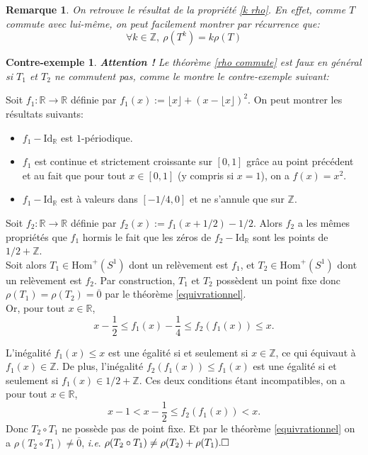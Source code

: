 \documentclass[11pt,a4 paper]{article}
\newtheorem{contrex}[theoreme]{Contre-exemple}
\newtheorem{rmq}[theoreme]{Remarque}
\begin{document}
\begin{rmq}
	On retrouve le résultat de la propriété \ref{k rho}. En effet, comme $T$ commute avec lui-même, on peut facilement montrer par récurrence que:
	$$\forall k \in \mathbb{Z}, \ \rho(T^k)=k\rho(T)$$
\end{rmq}










\begin{contrex} \textbf{Attention !} Le théorème \ref{rho commute} est faux en général si $T_1$ et $T_2$ ne commutent pas, comme le montre le contre-exemple suivant: \end{contrex}
	Soit $f_1: \mathbb{R} \to \mathbb{R}$ définie par $f_1(x):=\lfloor x \rfloor + (x - \lfloor x \rfloor)^2$. On peut montrer les résultats suivants:
	\begin{itemize}[label =$\bullet$]
		\item $f_1 - \mathrm{Id_{\mathbb{R}}}$ est $1$-périodique.
		\item $f_1$ est continue et strictement croissante sur $[0,1]$ grâce au point précédent et au fait que pour tout $x \in [0,1]$ (y compris si $x=1$), on a $f(x)=x^2$.
		\item $f_1 - \mathrm{Id_{\mathbb{R}}}$ est à valeurs dans $[-1/4,0]$ et ne s'annule que sur $\mathbb{Z}$.
	\end{itemize}
	Soit $f_2: \mathbb{R} \to \mathbb{R}$ définie par $f_2(x):=f_1(x +1/2)-1/2$. Alors $f_2$ a les mêmes propriétés que $f_1$ hormis le fait que les zéros de $f_2 - \mathrm{Id_{\mathbb{R}}}$ sont les points de $1/2 + \mathbb{Z}$.\\
	Soit alors $T_1 \in \mathrm{Hom}^+(S^1)$ dont un relèvement est $f_1$, et $T_2 \in \mathrm{Hom}^+(S^1)$ dont un relèvement est $f_2$. Par construction, $T_1$ et $T_2$ possèdent un point fixe donc $\rho(T_1)= \rho(T_2)=\overline{0}$ par le théorème \ref{equivrationnel}.\\
	Or, pour tout $x \in \mathbb{R}$,
	 $$x-\frac{1}{2}\leq f_1(x) - \frac{1}{4}  \leq f_2(f_1(x))\leq x.$$
	 
	 L'inégalité $f_1(x) \leq x$ est une égalité si et seulement si $x \in \mathbb{Z}$, ce qui équivaut à $f_1(x) \in \mathbb{Z}$. De plus, l'inégalité $f_2(f_1(x)) \leq f_1(x)$ est une égalité si et seulement si $f_1(x) \in 1/2 + \mathbb{Z}$. Ces deux conditions étant incompatibles, on a pour tout $x \in \mathbb{R}$, 
	$$x-1 < x - \frac{1}{2} \leq f_2(f_1(x))<x.$$
	Donc $T_2 \circ T_1$ ne possède pas de point fixe. Et par le théorème \ref{equivrationnel} on a $\rho(T_2 \circ T_1) \neq \overline{0}$, \textit{i.e}. $\rho(T_2 \circ T_1) \neq \rho(T_2)+ \rho(T_1). \hfill \square$\\
	
\end{document}
